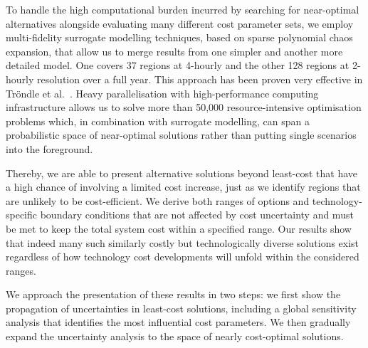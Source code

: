 
To handle the high computational burden incurred by searching for near-optimal
alternatives alongside evaluating many different cost parameter sets, we employ
multi-fidelity surrogate modelling techniques, based on sparse polynomial chaos
expansion, that allow us to merge results from one simpler and another more
detailed model. One covers 37 regions at 4-hourly and the other 128 regions at
2-hourly resolution over a full year. This approach has been proven very
effective in Tröndle et al.~\cite{trondle_trade-offs_2020}. Heavy
parallelisation with high-performance computing infrastructure allows us to
solve more than 50,000 resource-intensive optimisation problems which, in
combination with surrogate modelling, can span a probabilistic space of
near-optimal solutions rather than putting single scenarios into the foreground.


Thereby, we are able to present alternative solutions beyond least-cost that
have a high chance of involving a limited cost increase, just as we identify
regions that are unlikely to be cost-efficient. We derive both ranges of options
and technology-specific boundary conditions that are not affected by cost
uncertainty and must be met to keep the total system cost within a specified
range. Our results show that indeed many such similarly costly but
technologically diverse solutions exist regardless of how technology cost
developments will unfold within the considered ranges.

We approach the presentation of these results in two steps: we first show the
propagation of uncertainties in least-cost solutions, including a global
sensitivity analysis that identifies the most influential cost parameters. We
then gradually expand the uncertainty analysis to the space of nearly
cost-optimal solutions.





